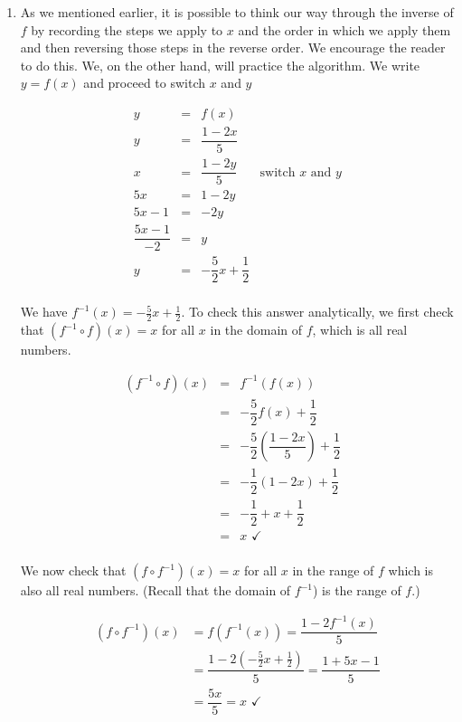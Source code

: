 {
\begin{enumerate}

\item  As we mentioned earlier, it is possible to think our way through the inverse of $f$ by recording the steps we apply to $x$ and the order in which we apply them and then reversing those steps in the reverse order.  We encourage the reader to do this.  We, on the other hand, will practice the algorithm.  We write $y=f(x)$ and proceed to switch $x$ and $y$

\[ \begin{array}{rclr}

y & = & f(x) & \\ [3pt]
y & = &  \dfrac{1-2x}{5} & \\ [6pt]
x & = & \dfrac{1-2y}{5} & \mbox{switch $x$ and $y$} \\ [6pt]
5x & = & 1 - 2y & \\
5x-1 & = & -2y & \\ 
\dfrac{5x-1}{-2} & = & y & \\ 
y & = & -\dfrac{5}{2} x + \dfrac{1}{2} & \\
\end{array} \]

We have $f^{-1}(x) = -\frac{5}{2} x + \frac{1}{2}$.  To check this answer analytically, we first check that $\left(f^{-1} \circ f \right)(x) = x $ for all $x$ in the domain of $f$, which is all real numbers.

\[ \begin{array}{rclr}
\left(f^{-1} \circ f \right)(x) & = & f^{-1}(f(x)) & \\ 
& = & -\dfrac{5}{2} f(x) + \dfrac{1}{2} & \\ [6pt]
& = & -\dfrac{5}{2} \left(\dfrac{1-2x}{5}\right) + \dfrac{1}{2} & \\ 
& = & -\dfrac{1}{2} (1-2x) + \dfrac{1}{2} & \\ [6pt]
& = & -\dfrac{1}{2} + x + \dfrac{1}{2} & \\ 
& = & x \, \, \checkmark \\

\end{array}\]

\drawexampleline

We now check that $\left(f \circ f^{-1} \right)(x) = x $ for all $x$ in the range of $f$ which is also all real numbers.  (Recall that the domain of $f^{-1}$) is the range of $f$.)

\begin{align*}
\left(f \circ f^{-1} \right)(x) & =  f(f^{-1}(x)) = \dfrac{1-2f^{-1}(x)}{5}  \\
& = \dfrac{1-2\left(  -\frac{5}{2} x + \frac{1}{2} \right)}{5}  = \dfrac{1+5x-1}{5} \\ 
& = \dfrac{5x}{5}  = x \, \, \checkmark
\end{align*}


\end{enumerate}}
